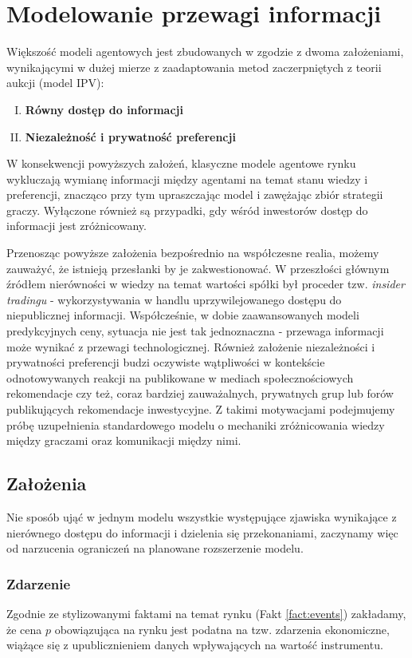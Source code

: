 \chapter{Modelowanie przewagi informacji}
Większość modeli agentowych jest zbudowanych w zgodzie z dwoma założeniami, wynikającymi w dużej mierze z zaadaptowania metod zaczerpniętych z teorii aukcji (model IPV): 
\begin{enumerate}[I.]
\item \textbf{Równy dostęp do informacji}
\item \textbf{Niezależność i prywatność preferencji}
\end{enumerate}
W konsekwencji powyższych założeń, klasyczne modele agentowe rynku wykluczają wymianę informacji między agentami na temat stanu wiedzy i preferencji, znacząco przy tym upraszczając model i zawężając zbiór strategii graczy. Wyłączone również są przypadki, gdy wśród inwestorów dostęp do informacji jest zróżnicowany. 

Przenosząc powyższe założenia bezpośrednio na współczesne realia, możemy zauważyć, że istnieją przesłanki by je zakwestionować. W przeszłości głównym źródłem nierówności w wiedzy na temat wartości spółki był proceder tzw. \textit{insider tradingu} - wykorzystywania w handlu uprzywilejowanego dostępu do niepublicznej informacji. Współcześnie, w dobie zaawansowanych modeli predykcyjnych ceny, sytuacja nie jest tak jednoznaczna - przewaga informacji może wynikać z przewagi technologicznej. Również założenie niezależności i prywatności preferencji budzi oczywiste wątpliwości w kontekście odnotowywanych reakcji na publikowane w mediach społecznościowych rekomendacje czy też, coraz bardziej zauważalnych, prywatnych grup lub forów publikujących rekomendacje inwestycyjne. Z takimi motywacjami podejmujemy próbę uzupełnienia standardowego modelu o mechaniki zróżnicowania wiedzy między graczami oraz komunikacji między nimi. 

\section{Założenia}\label{sec:assums}

Nie sposób ująć w jednym modelu wszystkie występujące zjawiska wynikające z nierównego dostępu do informacji i dzielenia się przekonaniami, zaczynamy więc od narzucenia ograniczeń na planowane rozszerzenie modelu.  

\subsection{Zdarzenie}
Zgodnie ze stylizowanymi faktami na temat rynku (Fakt \ref{fact:events}) zakładamy, że cena $p$ obowiązująca na rynku jest podatna na tzw. zdarzenia ekonomiczne, wiążące się z upublicznieniem danych wpływających na wartość instrumentu. 

